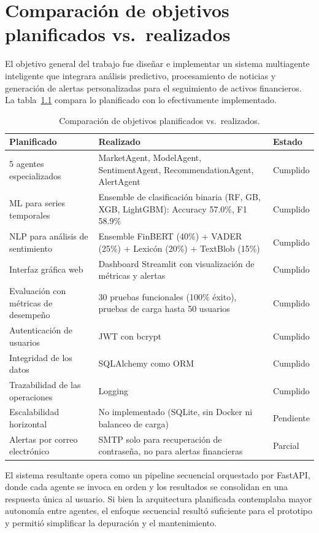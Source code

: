 \chapter{Comparación de objetivos planificados vs.\ realizados}
\label{apx:objetivos}

El objetivo general del trabajo fue diseñar e implementar un sistema multiagente
inteligente que integrara análisis predictivo, procesamiento de noticias y generación de
alertas personalizadas para el seguimiento de activos financieros.
La tabla~\ref{tab:apx-objetivos} compara lo planificado con lo efectivamente implementado.

\setlength{\extrarowheight}{6pt}
\begin{table}[H]
\centering
\caption{Comparación de objetivos planificados vs.\ realizados.}
\label{tab:apx-objetivos}
\small
\begin{tabular}{p{4.5cm}p{4.5cm}l}
\toprule
\textbf{Planificado} & \textbf{Realizado} & \textbf{Estado} \\
\midrule
5 agentes especializados & MarketAgent, ModelAgent, SentimentAgent, RecommendationAgent,
AlertAgent & Cumplido \\
\midrule
ML para series temporales & Ensemble de clasificación binaria (RF, GB, XGB, LightGBM):
Accuracy 57.0\%, F1 58.9\% & Cumplido \\
\midrule
NLP para análisis de sentimiento & Ensemble FinBERT (40\%) + VADER (25\%) + Lexicón (20\%) +
TextBlob (15\%) & Cumplido \\
\midrule
Interfaz gráfica web & Dashboard Streamlit con visualización de métricas y alertas &
Cumplido \\
\midrule
Evaluación con métricas de desempeño & 30 pruebas funcionales (100\% éxito), pruebas de
carga hasta 50 usuarios & Cumplido \\
\midrule
Autenticación de usuarios & JWT con bcrypt & Cumplido \\
\midrule
Integridad de los datos & SQLAlchemy como ORM & Cumplido \\
\midrule
Trazabilidad de las operaciones & Logging & Cumplido \\
\midrule
Escalabilidad horizontal & No implementado (SQLite, sin Docker ni balanceo de carga) &
Pendiente \\
\midrule
Alertas por correo electrónico & SMTP solo para recuperación de contraseña, no para alertas
financieras & Parcial \\
\bottomrule
\end{tabular}
\end{table}

El sistema resultante opera como un pipeline secuencial orquestado por FastAPI, donde cada
agente se invoca en orden y los resultados se consolidan en una respuesta única al usuario.
Si bien la arquitectura planificada contemplaba mayor autonomía entre agentes, el enfoque
secuencial resultó suficiente para el prototipo y permitió simplificar la depuración y el
mantenimiento.
